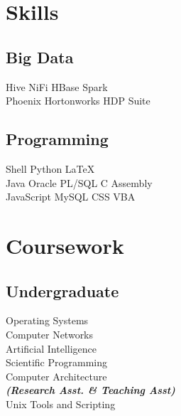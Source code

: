 \documentclass[a4paper]{deedy-resume} %
\begin{document}
\begin{minipage}[t]{0.33\textwidth}
\section{Skills}

\subsection{Big Data}
Hive \textbullet{} NiFi \textbullet{} HBase \textbullet{} Spark  \\
\textbullet{} Phoenix \textbullet{} Hortonworks HDP Suite \\

\sectionspace %
\subsection{Programming}

Shell \textbullet{}  Python \textbullet{} \LaTeX\ \\ 
Java \textbullet{} Oracle PL/SQL \textbullet{} C \textbullet{} Assembly \\
JavaScript \textbullet{}  MySQL \textbullet{} CSS \textbullet{} VBA

\sectionspace %


\section{Coursework}

\subsection{Undergraduate}

Operating Systems \\
Computer Networks \\
Artificial Intelligence \\
Scientific Programming \\
Computer Architecture \\
{\footnotesize \textit{\textbf{(Research Asst. \& Teaching Asst) }}} \\
Unix Tools and Scripting

\sectionspace %


\end{minipage}
\end{document}
